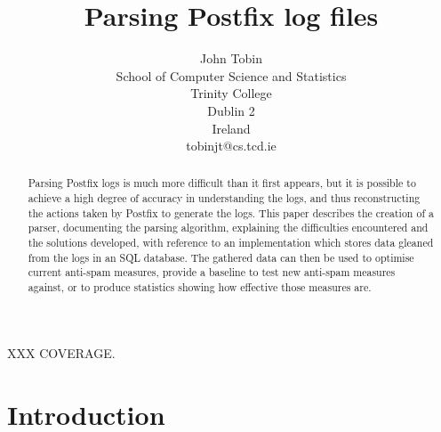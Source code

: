 \documentclass[a4paper,12pt,draft]{article}
\newcounter{dummy}
\begin{document}


\title{Parsing Postfix log files}
\author{John Tobin \\ School of Computer Science and Statistics \\
Trinity College \\ Dublin 2 \\ Ireland \\ tobinjt@cs.tcd.ie}
\maketitle

\begin{abstract}

    Parsing Postfix logs is much more difficult than it first appears, but
    it is possible to achieve a high degree of accuracy in understanding
    the logs, and thus reconstructing the actions taken by Postfix to
    generate the logs.  This paper describes the creation of a parser,
    documenting the parsing algorithm, explaining the difficulties
    encountered and the solutions developed, with reference to an
    implementation which stores data gleaned from the logs in an SQL
    database.  The gathered data can then be used to optimise current
    anti-spam measures, provide a baseline to test new anti-spam measures
    against, or to produce statistics showing how effective those measures
    are.

\end{abstract}

XXX COVERAGE\@.

\newpage
\tableofcontents
\listoffigures
\listoftables

\newpage
\section{Introduction}

\label{introduction}
\end{document}
